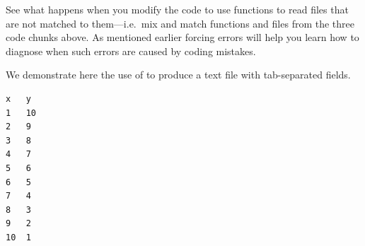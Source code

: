 \documentclass[krantz2,ChapterTOCs]{krantz}\usepackage{knitr}
\begin{document}
\begin{playground}
See what happens when you modify the code to use  functions to read files that are not matched to them---i.e.\ mix and match functions and files from the three code chunks above. As mentioned earlier forcing errors will help you learn how to diagnose when such errors are caused by coding mistakes.
\end{playground}

We demonstrate here the use of  to produce a text file with tab-separated fields.
\begin{knitrout}\footnotesize
{}\color{fgcolor}\begin{kframe}
\begin{alltt}
  \hlstd{=} \hlstd{)}
\hlstd{(}\hlstd{,}  \hlstd{=} \hlstd{)}
\end{alltt}
\end{kframe}
\end{knitrout}

\begin{knitrout}\footnotesize
{}\color{fgcolor}\begin{kframe}
\begin{verbatim}
x	y
1	10
2	9
3	8
4	7
5	6
6	5
7	4
8	3
9	2
10	1
\end{verbatim}
\end{kframe}
\end{knitrout}
\end{document}
